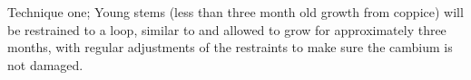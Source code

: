 Technique one; Young stems (less than three month old growth from coppice) will
be restrained to a loop, similar to \cite{jacobs1945l} and allowed to
grow for approximately three months, with regular adjustments of the restraints
to make sure the cambium is not damaged.